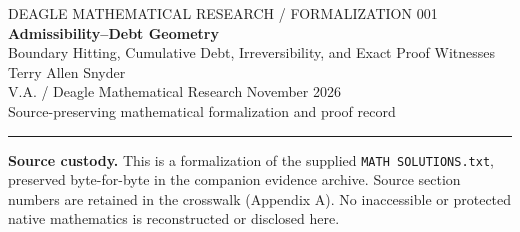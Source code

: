 \documentclass[11pt,letterpaper]{article}
\theoremstyle{definition}\newtheorem{definition}[theorem]{Definition}\newtheorem{example}[theorem]{Example}
\theoremstyle{remark}\newtheorem{remark}[theorem]{Remark}
\begin{document}
\begin{center}
{\small\color{gold}\MakeUppercase{Deagle Mathematical Research / Formalization 001}}\\[10pt]
{\LARGE\bfseries Admissibility--Debt Geometry}\\[5pt]
{\large Boundary Hitting, Cumulative Debt, Irreversibility, and Exact Proof Witnesses}\\[11pt]
{\large Terry Allen Snyder}\\[4pt]
{\small V.A. / Deagle Mathematical Research  November 2026}\\[7pt]
{\small\color{muted}Source-preserving mathematical formalization and proof record}
\end{center}
\vspace{5pt}\hrule\vspace{11pt}
\begin{abstract}
The source framework \emph{Admissibility--Debt Geometry} proposes that allowable evolution is constrained by an admissible region and cumulative curvature or stress debt. This paper retains that premise while separating (i) the original formulation from (ii) additional mathematical hypotheses needed for precise propositions. The central model is an augmented state $(x,d)$ with nonnegative locally integrable stress $k(t)$ and an accumulated debt $d(t)=d_0+\int_0^t k(s)\,\dd s$. Within this model we prove debt monotonicity, exact first-hitting and no-return properties, comparison bounds for hitting time, a logarithmic singularity criterion, and an eigenvalue threshold theorem for symmetric tensor debt. We give a counterexample to the unqualified assertion that admissibility alone implies Lyapunov stability, and determine precisely what subtracting mean ghost noise accomplishes. A reproducible exact-rational worked example emits scope-limited certificates and linked receipts. The results are mathematical statements within the specified model; identifying their hypotheses in a physical application is a separate task.
\end{abstract}
\noindent\textbf{Source custody.} This is a formalization of the supplied \texttt{MATH SOLUTIONS.txt}, preserved byte-for-byte in the companion evidence archive. Source section numbers are retained in the crosswalk (Appendix A). No inaccessible or protected native mathematics is reconstructed or disclosed here.
\end{document}
